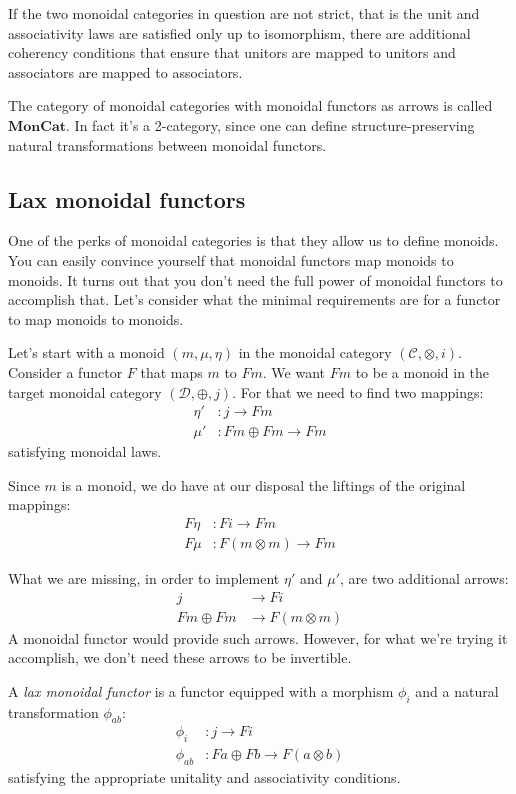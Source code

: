 \documentclass[DaoFP]{subfiles}
\begin{document}
If the two monoidal categories in question are not strict, that is the unit and associativity laws are satisfied only up to isomorphism, there are additional coherency conditions that ensure that unitors are mapped to unitors and associators are mapped to associators.

The category of monoidal categories with monoidal functors as arrows is called $\mathbf{MonCat}$. In fact it's a 2-category, since one can define structure-preserving natural transformations between monoidal functors.

\subsection{Lax monoidal functors}

One of the perks of monoidal categories is that they allow us to define monoids. You can easily convince yourself that monoidal functors map monoids to monoids. It turns out that you don't need the full power of monoidal functors to accomplish that. Let's consider what the minimal requirements are  for a functor to map monoids to monoids. 

Let's start with a monoid $(m, \mu, \eta)$ in the monoidal category $(\mathcal{C}, \otimes, i)$. Consider a functor $F$ that maps $m$ to $F m$. We want $F m$ to be a monoid in the target monoidal category $(\mathcal{D}, \oplus, j)$. For that we need to find two mappings:
\begin{align*}
\eta' &\colon j \to F m \\
 \mu' &\colon F m \oplus F m \to F m 
\end{align*}
satisfying monoidal laws.

Since $m$ is a monoid, we do have at our disposal the liftings of the original mappings:
\begin{align*}
 F \eta &\colon F i \to F m \\
 F \mu &\colon F (m \otimes m) \to F m
\end{align*}

What we are missing, in order to implement $\eta'$ and $\mu'$, are two additional arrows:
\begin{align*}
j &\to F i\\
 F m \oplus F m &\to F (m \otimes m)
 \end{align*}
A monoidal functor would provide such arrows. However, for what we're trying it accomplish, we don't need these arrows to be invertible. 

A \emph{lax monoidal functor} is a functor equipped with a morphism $\phi_i$ and a natural transformation $\phi_{ab}$:
\begin{align*}
\phi_i &\colon j \to F i \\
\phi_{a b} &\colon F a \oplus F b \to F (a \otimes b)
\end{align*}
satisfying the appropriate unitality and associativity conditions.
\end{document}
